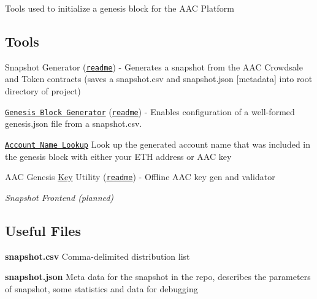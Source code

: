 Tools used to initialize a genesis block for the A\+AC Platform

\subsection*{Tools}


\begin{DoxyItemize}
\item Snapshot Generator (\href{https://github.com/AACIO/genesis/tree/master/tools/snapshot}{\tt readme}) -\/ Generates a snapshot from the A\+AC Crowdsale and Token contracts (saves a snapshot.\+csv and snapshot.\+json \mbox{[}metadata\mbox{]} into root directory of project)
\item \href{https://aacio.github.io/genesis/}{\tt Genesis Block Generator} (\href{https://github.com/AACIO/genesis/tree/master/tools/genesis}{\tt readme}) -\/ Enables configuration of a well-\/formed genesis.\+json file from a snapshot.\+csv.
\item \href{https://aacio.github.io/genesis/tools/account-name/index.html}{\tt Account Name Lookup} Look up the generated account name that was included in the genesis block with either your E\+TH address or A\+AC key
\item A\+AC Genesis \mbox{\hyperlink{struct_key}{Key}} Utility (\href{https://github.com/AACIO/genesis/tree/master/tools/keys}{\tt readme}) -\/ Offline A\+AC key gen and validator
\item {\itshape Snapshot Frontend (planned)}
\end{DoxyItemize}

\subsection*{Useful Files}


\begin{DoxyItemize}
\item {\bfseries snapshot.\+csv} Comma-\/delimited distribution list
\item {\bfseries snapshot.\+json} Meta data for the snapshot in the repo, describes the parameters of snapshot, some statistics and data for debugging 
\end{DoxyItemize}